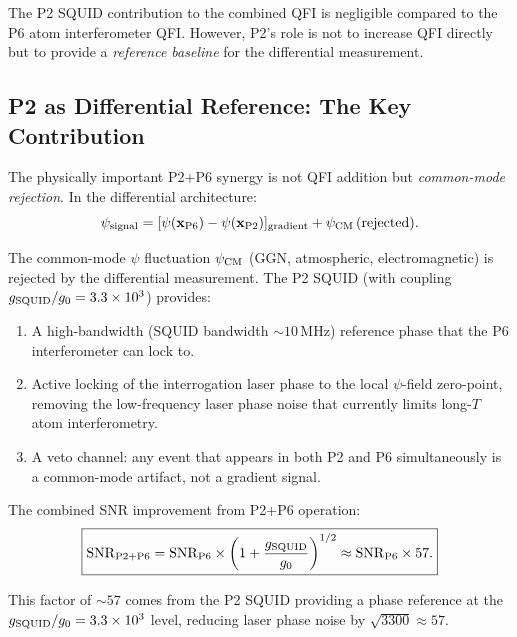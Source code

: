 \documentclass[11pt]{article}
\theoremstyle{definition}
\theoremstyle{remark}
\begin{document}
The P2 SQUID contribution to the combined QFI is negligible compared
to the P6 atom interferometer QFI. However, P2's role is not to increase
QFI directly but to provide a \emph{reference baseline} for the differential
measurement.

\subsection{P2 as Differential Reference: The Key Contribution}

The physically important P2+P6 synergy is not QFI addition but
\emph{common-mode rejection}. In the differential architecture:
\begin{equation}
\psi_{\rm signal} = [\psi(\mathbf{x}_{\rm P6}) - \psi(\mathbf{x}_{\rm P2})]_{\rm gradient}
+ \psi_{\rm CM}\,({\rm rejected}).
\end{equation}

The common-mode $\psi$ fluctuation $\psi_{\rm CM}$ (GGN, atmospheric,
electromagnetic) is rejected by the differential measurement. The P2 SQUID
(with coupling $g_{\rm SQUID}/g_0 = 3.3\times10^3$) provides:

\begin{enumerate}
\item A high-bandwidth (SQUID bandwidth $\sim 10$\,MHz) reference phase
  that the P6 interferometer can lock to.
\item Active locking of the interrogation laser phase to the local $\psi$-field
  zero-point, removing the low-frequency laser phase noise that currently
  limits long-$T$ atom interferometry.
\item A veto channel: any event that appears in both P2 and P6 simultaneously
  is a common-mode artifact, not a gradient signal.
\end{enumerate}

The combined SNR improvement from P2+P6 operation:
\begin{equation}
\boxed{
\mathrm{SNR}_{\rm P2+P6} = \mathrm{SNR}_{\rm P6} \times \left(1 + \frac{g_{\rm SQUID}}{g_0}\right)^{1/2}
\approx \mathrm{SNR}_{\rm P6} \times 57.
}
\label{eq:p2p6-snr}
\end{equation}

This factor of $\sim 57$ comes from the P2 SQUID providing a phase reference
at the $g_{\rm SQUID}/g_0 = 3.3\times10^3$ level, reducing laser phase noise
by $\sqrt{3300} \approx 57$.
\end{document}
